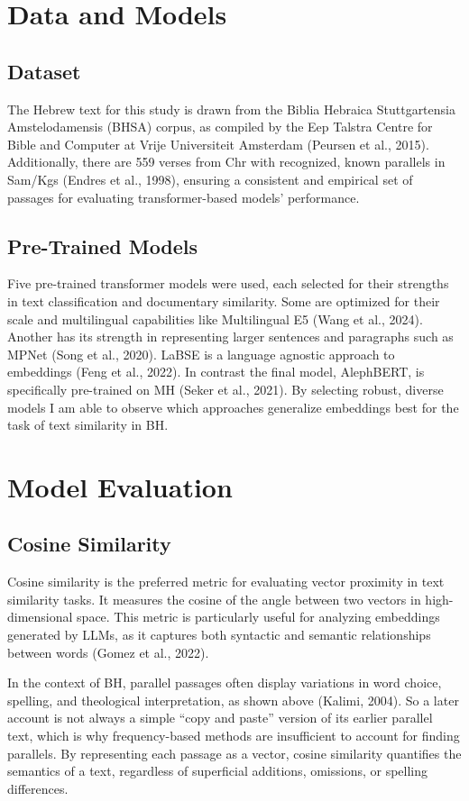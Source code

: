 \documentclass[12pt]{article}
\begin{document}
\section{Data and Models}
\subsection{Dataset}
The Hebrew text for this study is drawn from the Biblia Hebraica Stuttgartensia Amstelodamensis (BHSA) corpus, as compiled by the Eep Talstra Centre for Bible and Computer at Vrije Universiteit Amsterdam (Peursen et al., 2015). Additionally, there are 559 verses from Chr with recognized, known parallels in Sam/Kgs (Endres et al., 1998), ensuring a consistent and empirical set of passages for evaluating transformer-based models’ performance.

\subsection{Pre-Trained Models}
Five pre-trained transformer models were used, each selected for their strengths in text classification and documentary similarity. Some are optimized for their scale and multilingual capabilities like Multilingual E5 (Wang et al., 2024). Another has its strength in representing larger sentences and paragraphs such as MPNet (Song et al., 2020).  LaBSE is a language agnostic approach to embeddings (Feng et al., 2022). In contrast the final model, AlephBERT, is specifically pre-trained on MH (Seker et al., 2021). By selecting robust, diverse models I am able to observe which approaches generalize embeddings best for the task of text similarity in BH.

\section{Model Evaluation}
\subsection{Cosine Similarity}
Cosine similarity is the preferred metric for evaluating vector proximity in text similarity tasks. It measures the cosine of the angle between two vectors in high-dimensional space. This metric is particularly useful for analyzing embeddings generated by LLMs, as it captures both syntactic and semantic relationships between words (Gomez et al., 2022).

In the context of BH, parallel passages often display variations in word choice, spelling, and theological interpretation, as shown above (Kalimi, 2004). So a later account is not always a simple “copy and paste” version of its earlier parallel text, which is why frequency-based methods are insufficient to account for finding parallels. By representing each passage as a vector, cosine similarity quantifies the semantics of a text, regardless of superficial additions, omissions, or spelling differences.
\end{document}
